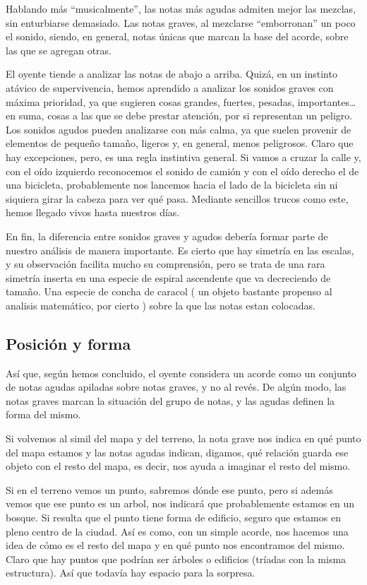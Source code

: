 \documentclass[]{article}
\begin{document}
Hablando más ``musicalmente'', las notas más agudas admiten mejor las mezclas, sin enturbiarse demasiado. Las notas graves, al mezclarse ``emborronan'' un poco el sonido, siendo, en general, notas únicas que marcan la base del acorde, sobre las que se agregan otras.

El oyente tiende a analizar las notas de abajo a arriba. Quizá, en un instinto atávico de supervivencia, hemos aprendido a analizar los sonidos graves con máxima prioridad, ya que sugieren cosas grandes, fuertes, pesadas, importantes\ldots{} en suma, cosas a las que se debe prestar atención, por si representan un peligro. Los sonidos agudos pueden analizarse con más calma, ya que suelen provenir de elementos de pequeño tamaño, ligeros y, en general, menos peligrosos. Claro que hay excepciones, pero, es una regla instintiva general. Si vamos a cruzar la calle y, con el oído izquierdo reconocemos el sonido de camión y con el oído derecho el de una bicicleta, probablemente nos lancemos hacia el lado de la bicicleta sin ni siquiera girar la cabeza para ver qué pasa. Mediante sencillos trucos como este, hemos llegado vivos hasta nuestros días.

En fin, la diferencia entre sonidos graves y agudos debería formar parte de nuestro análisis de manera importante. Es cierto que hay simetría en las escalas, y su observación facilita mucho su comprensión, pero se trata de una rara simetría inserta en una especie de espiral ascendente que va decreciendo de tamaño. Una especie de concha de caracol ( un objeto bastante propenso al analisis matemático, por cierto ) sobre la que las notas estan colocadas.

\subsection{Posición y forma}

Así que, según hemos concluido, el oyente considera un acorde como un conjunto de notas agudas apiladas sobre notas graves, y no al revés. De algún modo, las notas graves marcan la situación del grupo de notas, y las agudas definen la forma del mismo.

Si volvemos al simil del mapa y del terreno, la nota grave nos indica en qué punto del mapa estamos y las notas agudas indican, digamos, qué relación guarda ese objeto con el resto del mapa, es decir, nos ayuda a imaginar el resto del mismo.

Si en el terreno vemos un punto, sabremos dónde ese punto, pero si además vemos que ese punto es un arbol, nos indicará que probablemente estamos en un bosque. Si resulta que el punto tiene forma de edificio, seguro que estamos en pleno centro de la ciudad. Así es como, con un simple acorde, nos hacemos una idea de cómo es el resto del mapa y en qué punto nos encontramos del mismo. Claro que hay puntos que podrían ser árboles o edificios (tríadas con la misma estructura). Así que todavía hay espacio para la sorpresa.
\end{document}
